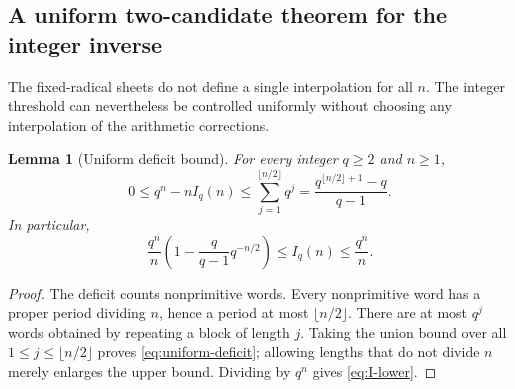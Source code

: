\documentclass[11pt]{article}
\numberwithin{equation}{section}
\newtheorem{lemma}[theorem]{Lemma}
\theoremstyle{definition}
\begin{document}
\subsection{A uniform two-candidate theorem for the integer inverse}

The fixed-radical sheets do not define a single interpolation for all $n$. The integer threshold can nevertheless be controlled uniformly without choosing any interpolation of the arithmetic corrections.

\begin{lemma}[Uniform deficit bound]\label{lem:irreducible-bound}
For every integer $q\ge2$ and $n\ge1$,
\begin{equation}\label{eq:uniform-deficit}
 0\le q^n-nI_q(n)
 \le\sum_{j=1}^{\lfloor n/2\rfloor}q^j
 =\frac{q^{\lfloor n/2\rfloor+1}-q}{q-1}.
\end{equation}
In particular,
\begin{equation}\label{eq:I-lower}
 \frac{q^n}{n}\left(1-\frac q{q-1}q^{-n/2}\right)
 \le I_q(n)\le\frac{q^n}{n}.
\end{equation}
\end{lemma}
\begin{proof}
The deficit counts nonprimitive words. Every nonprimitive word has a proper period dividing $n$, hence a period at most $\lfloor n/2\rfloor$. There are at most $q^j$ words obtained by repeating a block of length $j$. Taking the union bound over all $1\le j\le\lfloor n/2\rfloor$ proves \eqref{eq:uniform-deficit}; allowing lengths that do not divide $n$ merely enlarges the upper bound. Dividing by $q^n$ gives \eqref{eq:I-lower}.
\end{proof}
\end{document}
